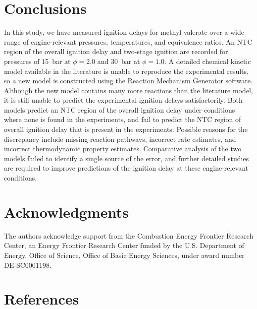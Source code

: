 \documentclass[letterpaper, review, sort&compress]{elsarticle}
\begin{document}
\section{Conclusions}\label{sec:conclusions}

In this study, we have measured ignition delays for methyl valerate over a wide range of
engine-relevant pressures, temperatures, and equivalence ratios. An NTC region of the overall
ignition delay and two-stage ignition are recorded for pressures of \SI{15}{\bar} at \(\phi=2.0\)
and \SI{30}{\bar} at \(\phi=1.0\). A detailed chemical kinetic model available in the literature is
unable to reproduce the experimental results, so a new model is constructed using the Reaction
Mechanism Generator software. Although the new model contains many more reactions than the
literature model, it is still unable to predict the experimental ignition delays satisfactorily.
Both models predict an NTC region of the overall ignition delay under conditions where none is found
in the experiments, and fail to predict the NTC region of overall ignition delay that is present in
the experiments. Possible reasons for the discrepancy include missing reaction pathways, incorrect
rate estimates, and incorrect thermodynamic property estimates. Comparative analysis of the two
models failed to identify a single source of the error, and further detailed studies are required to
improve predictions of the ignition delay at these engine-relevant conditions.

\section{Acknowledgments}\label{sec:acknowledgments}

The authors acknowledge support from the Combustion Energy Frontier Research Center, an Energy
Frontier Research Center funded by the U.S. Department of Energy, Office of Science, Office of Basic
Energy Sciences, under award number DE-SC0001198.

\section*{References}

\end{document}
